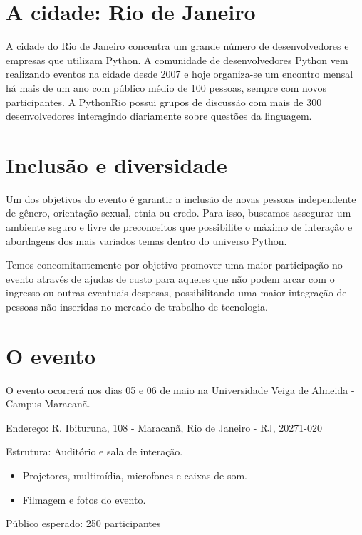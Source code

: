 \documentclass[12pt]{article}
\begin{document}
\section{A cidade: Rio de Janeiro}

A cidade do Rio de Janeiro concentra um grande número de desenvolvedores e empresas que utilizam Python. A comunidade de desenvolvedores Python vem realizando eventos na cidade desde 2007 e hoje organiza-se um encontro mensal há mais de um ano com público médio de 100 pessoas, sempre com novos participantes. A PythonRio possui grupos de discussão com mais de 300 desenvolvedores interagindo diariamente sobre questões da linguagem.


\section{Inclusão e diversidade}

Um dos objetivos do evento é garantir a inclusão de novas pessoas independente de gênero, orientação sexual, etnia ou credo. Para isso, buscamos assegurar um ambiente seguro e livre de preconceitos que possibilite o máximo de interação e abordagens dos mais variados temas dentro do universo Python. 

Temos concomitantemente por objetivo promover uma maior participação no evento através de ajudas de custo para aqueles que não podem arcar com o ingresso ou outras eventuais despesas, possibilitando uma maior integração de pessoas não inseridas no mercado de trabalho de tecnologia.

\section{O evento}

O evento ocorrerá nos dias 05 e 06 de maio na Universidade Veiga de Almeida - Campus Maracanã.

Endereço: R. Ibituruna, 108 - Maracanã, Rio de Janeiro - RJ, 20271-020

Estrutura: Auditório e sala de interação. 

\begin{itemize}[label={}]
    \item Projetores, multimídia, microfones e caixas de som.
    \item Filmagem e fotos do evento.
\end{itemize}

Público esperado: 250 participantes
\end{document}

